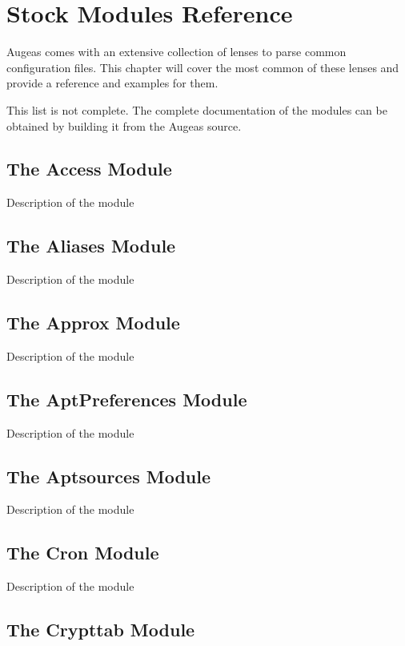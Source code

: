 \chapter{Stock Modules Reference}

Augeas comes with an extensive collection of lenses to parse common configuration files. This chapter will cover the most common of these lenses and provide a reference and examples for them.

This list is not complete. The complete documentation of the modules can be obtained by building it from the Augeas source.

\section{The Access Module}

Description of the module

\section{The Aliases Module}

Description of the module

\section{The Approx Module}

Description of the module

\section{The AptPreferences Module}

Description of the module

\section{The Aptsources Module}

Description of the module

\section{The Cron Module}

Description of the module

\section{The Crypttab Module}

